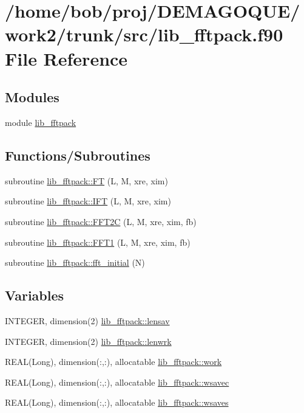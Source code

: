 \hypertarget{lib__fftpack_8f90}{
\section{/home/bob/proj/DEMAGOQUE/work2/trunk/src/lib\_\-fftpack.f90 File Reference}
\label{lib__fftpack_8f90}
}
\subsection*{Modules}
\begin{DoxyCompactItemize}
\item 
module \hyperlink{namespacelib__fftpack}{lib\_\-fftpack}
\end{DoxyCompactItemize}
\subsection*{Functions/Subroutines}
\begin{DoxyCompactItemize}
\item 
subroutine \hyperlink{namespacelib__fftpack_af2aa9b83c8db599ebc1c6067577196c0}{lib\_\-fftpack::FT} (L, M, xre, xim)
\item 
subroutine \hyperlink{namespacelib__fftpack_af56d1d1be2bb706b859f005211a0c456}{lib\_\-fftpack::IFT} (L, M, xre, xim)
\item 
subroutine \hyperlink{namespacelib__fftpack_a5c1e7931d9bdbe2b1ea0a987081b0515}{lib\_\-fftpack::FFT2C} (L, M, xre, xim, fb)
\item 
subroutine \hyperlink{namespacelib__fftpack_a7f10fb88597cc6a353d06d4695e8087a}{lib\_\-fftpack::FFT1} (L, M, xre, xim, fb)
\item 
subroutine \hyperlink{namespacelib__fftpack_aa19152959277a8d6578da7c1a6fc0230}{lib\_\-fftpack::fft\_\-initial} (N)
\end{DoxyCompactItemize}
\subsection*{Variables}
\begin{DoxyCompactItemize}
\item 
INTEGER, dimension(2) \hyperlink{namespacelib__fftpack_ad1ac8096e29c8f4d4eccbbcd5ff74bf1}{lib\_\-fftpack::lensav}
\item 
INTEGER, dimension(2) \hyperlink{namespacelib__fftpack_af22a24940af26c19850b9add69cc2adf}{lib\_\-fftpack::lenwrk}
\item 
REAL(Long), dimension(:,:), allocatable \hyperlink{namespacelib__fftpack_ac4c893477b0614d957edb4530d018191}{lib\_\-fftpack::work}
\item 
REAL(Long), dimension(:,:), allocatable \hyperlink{namespacelib__fftpack_a45c5d0eb1be9cdebf49b3c56e861d0d6}{lib\_\-fftpack::wsavec}
\item 
REAL(Long), dimension(:,:), allocatable \hyperlink{namespacelib__fftpack_a6ab9f0bc33149a5032987f2f843f883e}{lib\_\-fftpack::wsaves}
\end{DoxyCompactItemize}
